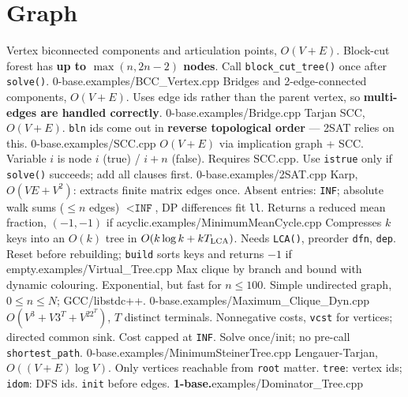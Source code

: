 \section{Graph}
%
{Vertex biconnected components and articulation points, $O(V+E)$. Block-cut forest has \textbf{up to $\max(n,2n-2)$ nodes}. Call \texttt{block\_cut\_tree()} once after \texttt{solve()}. 0-base.}{examples/BCC_Vertex.cpp}
%
{Bridges and 2-edge-connected components, $O(V+E)$. Uses edge ids rather than the parent vertex, so \textbf{multi-edges are handled correctly}. 0-base.}{examples/Bridge.cpp}
%
{Tarjan SCC, $O(V+E)$. \texttt{bln} ids come out in \textbf{reverse topological order} --- 2SAT relies on this. 0-base.}{examples/SCC.cpp}
%
{$O(V+E)$ via implication graph + SCC. Variable $i$ is node $i$ (true) / $i+n$ (false). Requires SCC.cpp. Use \texttt{istrue} only if \texttt{solve()} succeeds; add all clauses first. 0-base.}{examples/2SAT.cpp}
%
{Karp, $O(VE+V^2)$: extracts finite matrix edges once. Absent entries: \texttt{INF}; absolute walk sums ($\le n$ edges) $<\texttt{INF}$, DP differences fit \texttt{ll}. Returns a reduced mean fraction, $(-1,-1)$ if acyclic.}{examples/MinimumMeanCycle.cpp}
%
{Compresses $k$ keys into an $O(k)$ tree in $O(k\log k+kT_{\rm LCA})$. Needs \texttt{LCA()}, preorder \texttt{dfn}, \texttt{dep}. Reset before rebuilding; \texttt{build} sorts keys and returns $-1$ if empty.}{examples/Virtual_Tree.cpp}
%
{Max clique by branch and bound with dynamic colouring. Exponential, but fast for $n\le100$. Simple undirected graph, $0\le n\le N$; GCC/libstdc++. 0-base.}{examples/Maximum_Clique_Dyn.cpp}
%
{$O(V^3+V3^T+V^22^T)$, $T$ distinct terminals. Nonnegative costs, \texttt{vcst} for vertices; directed common sink. Cost capped at \texttt{INF}. Solve once/init; no pre-call \texttt{shortest\_path}. 0-base.}{examples/MinimumSteinerTree.cpp}
%
{Lengauer-Tarjan, $O((V+E)\log V)$. Only vertices reachable from \texttt{root} matter. \texttt{tree}: vertex ids; \texttt{idom}: DFS ids. \texttt{init} before edges. \textbf{1-base.}}{examples/Dominator_Tree.cpp}
